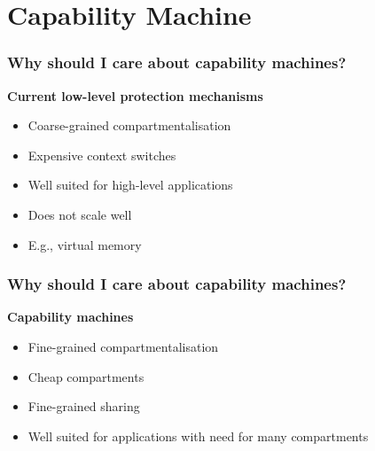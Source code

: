 \documentclass{beamer}
\begin{document}
\section{Capability Machine}
\begin{frame}
  \frametitle{ Why should I care about capability machines? }
  \textbf{Current low-level protection mechanisms}
  \begin{itemize}
  \item Coarse-grained compartmentalisation 
  \item Expensive context switches 
  \item Well suited for high-level applications
  \item Does not scale well
  \item E.g., virtual memory
  \end{itemize}
\end{frame}

\begin{frame}
  \frametitle{ Why should I care about capability machines? }
  \textbf{Capability machines}
  \begin{itemize}
  \item Fine-grained compartmentalisation
  \item Cheap compartments
  \item Fine-grained sharing
  \item Well suited for applications with need for many compartments
  \end{itemize}
\end{frame}
\end{document}
